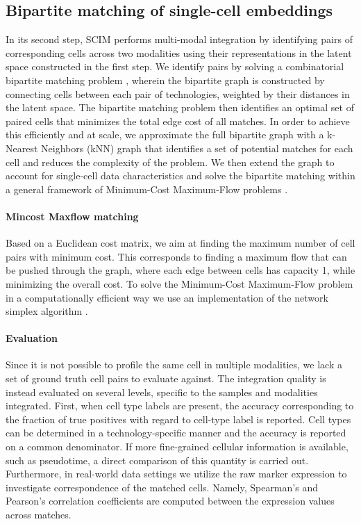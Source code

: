 \subsection{Bipartite matching of single-cell embeddings}
In its second step, SCIM performs multi-modal integration by identifying pairs of corresponding cells across two modalities using their representations in the latent space constructed in the first step.
We identify pairs by solving a combinatorial bipartite matching problem \cite{Ahuja1993,DellAmico2000}, wherein the bipartite graph is constructed by connecting cells between each pair of technologies, weighted by their distances in the latent space.
The bipartite matching problem then identifies an optimal set of paired cells that minimizes the total edge cost of all matches.
In order to achieve this efficiently and at scale, we approximate the full bipartite graph with a k-Nearest Neighbors (kNN) graph that identifies a set of potential matches for each cell and reduces the complexity of the problem.
We then extend the graph to account for single-cell data characteristics and solve the bipartite matching within a general framework of Minimum-Cost Maximum-Flow problems \cite{Ahuja1993,Klein1967}.

\paragraph{Min\-cost Max\-flow matching}
Based on a Euclidean cost matrix, we aim at finding the maximum number of cell pairs with minimum cost.
This corresponds to finding a maximum flow that can be pushed through the graph, where each edge between cells has capacity 1, while minimizing the overall cost.
To solve the Minimum-Cost Maximum-Flow problem in a computationally efficient way we use an implementation of the network simplex algorithm \cite{Kiraly2012}.

\paragraph{Evaluation}
Since it is not possible to profile the same cell in multiple modalities, we lack a set of ground truth cell pairs to evaluate against.
The integration quality is instead evaluated on several levels, specific to the samples and modalities integrated.
First, when cell type labels are present, the accuracy corresponding to the fraction of true positives with regard to cell-type label is reported.
Cell types can be determined in a technology-specific manner and the accuracy is reported on a common denominator.
If more fine-grained cellular information is available, such as pseudotime, a direct comparison of this quantity is carried out.
Furthermore, in real-world data settings we utilize the raw marker expression to investigate correspondence of the matched cells.
Namely, Spearman’s and Pearson’s correlation coefficients are computed between the expression values across matches.

